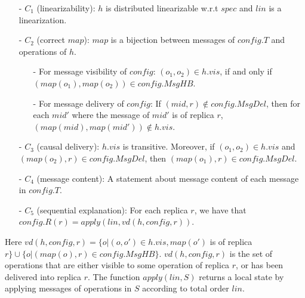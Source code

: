\begin{itemize}
\setlength{\itemsep}{0.5pt}
\item[-] $C_1$ (linearizability): $h$ is distributed linearizable w.r.t $\mathit{spec}$ and $\mathit{lin}$ is a linearization.

\item[-] $C_2$ (correct $\mathit{map}$): $\mathit{map}$ is a bijection between messages of $\mathit{config}.T$ and operations of $h$.

    \begin{itemize}
    \setlength{\itemsep}{0.5pt}
    \item[-] For message visibility of $\mathit{config}$: $(o_1,o_2) \in h.\mathit{vis}$, if and only if $(\mathit{map}(o_1),\mathit{map}(o_2)) \in \mathit{config}.\mathit{MsgHB}$.

    \item[-] For message delivery of $\mathit{config}$: If $(\mathit{mid},r) \notin \mathit{config}.\mathit{MsgDel}$, then for each $\mathit{mid}'$ where the message of $\mathit{mid}'$ is of replica $r$, $(\mathit{map}(\mathit{mid}),\mathit{map}(\mathit{mid}')) \notin h.\mathit{vis}$.
    \end{itemize}

\item[-] $C_3$ (causal delivery): $h.\mathit{vis}$ is transitive. Moreover, if $(o_1,o_2) \in h.\mathit{vis}$ and $(\mathit{map}(o_2),r) \in \mathit{config}.\mathit{MsgDel}$, then $(\mathit{map}(o_1),r) \in \mathit{config}.\mathit{MsgDel}$.

\item[-] $C_4$ (message content): A statement about message content of each message in $\mathit{config}.T$.

\item[-] $C_5$ (sequential explanation): For each replica $r$, we have that $\mathit{config}.R(r) = \mathit{apply}(\mathit{lin},\mathit{vd}(h,\mathit{config},r))$.
\end{itemize}

Here $\mathit{vd}(h,\mathit{config},r) = \{ o \vert (o,o') \in h.\mathit{vis}, \mathit{map}(o')$ is of replica $r \} \cup \{ o \vert (\mathit{map}(o),r) \in \mathit{config}.\mathit{MsgHB} \}$. $\mathit{vd}(h,\mathit{config},r)$ is the set of operations that are either visible to some operation of replica $r$, or has been delivered into replica $r$. The function $\mathit{apply}(\mathit{lin},S)$ returns a local state by applying messages of operations in $S$ according to total order $\mathit{lin}$.


